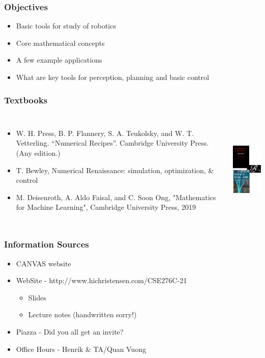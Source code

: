 \documentclass[10pt]{beamer}
\begin{document}
\begin{frame}
  \frametitle{Objectives}
  \begin{itemize}
  \item Basic tools for study of robotics
  \item Core mathematical concepts
  \item A few example applications
  \item What are key tools for perception, planning and basic control
  \end{itemize}
\end{frame}

\begin{frame}
  \frametitle{Textbooks}
  \begin{columns}
    \column{7cm}
    \begin{itemize}
    \item W. H. Press, B. P. Flannery, S. A. Teukolsky, and W. T. Vetterling. ``Numerical Recipes''. Cambridge University Press. (Any edition.)
    \item T. Bewley, Numerical Renaissance: simulation, optimization, \& control
    \item M. Deisenroth, A. Aldo Faisal, and C. Soon Ong, "Mathematics for Machine Learning", Cambridge University Press, 2019
    \end{itemize}
    \column{3cm}
    \begin{center}
      \includegraphics[height=5cm]{books}
    \end{center}
  \end{columns}
\end{frame}

\begin{frame}
  \frametitle{Information Sources}
  \begin{itemize}
  \item CANVAS website
  \item WebSite - http://www.hichristensen.com/CSE276C-21
    \begin{itemize}
    \item Slides
    \item Lecture notes (handwritten sorry!)
    \end{itemize}
  \item Piazza - Did you all get an invite?
  \item Office Hours - Henrik \& TA/Quan Vuong
  \end{itemize}
\end{frame}
\end{document}

